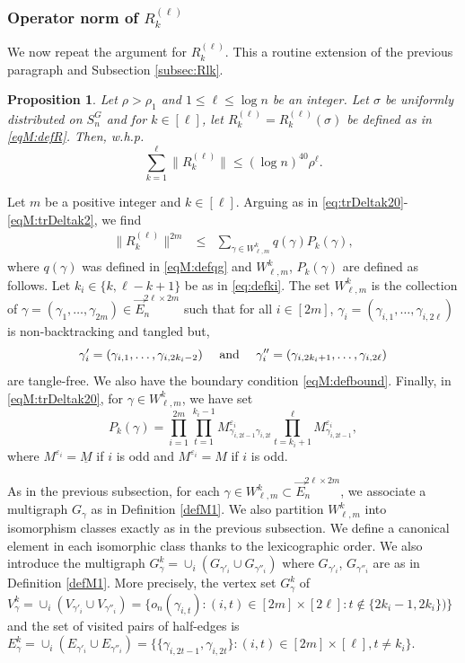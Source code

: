 \documentclass[11pt]{article}
\newtheorem{proposition}[lemma]{Proposition}
\newcommand{\cE}{E}
\newcommand{\1}{1\!\!{\sf I}}\newcommand{\IND}{\1}
\newcommand{\veps}{\varepsilon}
\newcommand{\whp}{{w.h.p.~}}
\begin{document}
\subsubsection{Operator norm of $R^{(\ell)}_{k}$}

We now repeat the argument for $R^{(\ell)}_{k}$. This a routine extension of the previous paragraph and Subsection \ref{subsec:Rlk}. 
\begin{proposition} \label{propM:normR}
Let  $\rho > \rho_1$ and $1 \leq \ell  \leq  \log n$ be an integer.  Let $\sigma$ be uniformly distributed on $S^G_n$ and  for $k \in [\ell]$, let $R_k^{(\ell)} = R_k^{(\ell)} (\sigma)$ be defined as in \eqref{eqM:defR}.  
Then, \whp  
$$ \sum_{k=1} ^\ell \| R_k^{(\ell)} \| \leq ( \log n) ^{40}   \rho ^{\ell}.$$
\end{proposition}
Let $m$ be a positive integer and $k \in [\ell]$. Arguing as in  \eqref{eq:trDeltak20}-\eqref{eqM:trDeltak2}, we find
\begin{eqnarray}
\| R^{(\ell)}_{k}  \| ^{2 m}  &\leq & \sum_{\gamma \in W^k_{\ell,m}} q (\gamma)  P_k (\gamma), \label{eqM:trDeltak20}
\end{eqnarray}
where $q(\gamma)$ was defined in \eqref{eqM:defqg} and $W^k_{\ell,m}$, $P_k(\gamma)$ are defined as follows. Let $k_i \in \{ k , \ell - k +1 \}$ be as in \eqref{eq:defki}. The set $W^k_{\ell,m}$ is the collection of  $\gamma = ( \gamma_1, \ldots, \gamma_{2m}) \in \vec E_n^{2\ell  \times 2m}$ such that for all $i \in [2m]$, $\gamma_i  = (\gamma_{i,1}, \ldots, \gamma_{i,2\ell})$ is non-backtracking and tangled but,  $$\gamma'_i = ( \gamma_{i,1}, \ldots , \gamma_{i,2k_i-2}) \quad  \hbox{ and } \quad \gamma''_i =  ( \gamma_{i,2k_i+1}, \ldots , \gamma_{i,2\ell})$$ are tangle-free.  We also have the boundary condition \eqref{eqM:defbound}. Finally, in \eqref{eqM:trDeltak20}, for $\gamma \in W^k_{\ell,m}$, we have set 
$$P_k (\gamma) =  \prod_{i=1}^{2m}  \prod_{t=1}^{k_i-1}  M^{\veps_i}_{\gamma_{i,2t-1}  \gamma_{i,2t}}   \prod_{t=k_i+1}^{\ell} M^{\veps_i}_{\gamma_{i,2t-1}}, $$
where $M^{\veps_i} = \underline M$ if $i$ is odd and $M^{\veps_i} = M$ if $i$ is odd.




As in the previous subsection, for each $\gamma \in W^k_{\ell,m} \subset \vec E_n^{2\ell \times 2m}$, we associate a multigraph $G_\gamma$ as in Definition \ref{defM1}.  We also partition  $W^k_{\ell,m}$ into isomorphism classes exactly as in the previous subsection. We define a canonical element in each isomorphic class thanks to the lexicographic order.  We also introduce the multigraph $G^k_\gamma = \cup_{i} (G_{\gamma'_i} \cup G_{\gamma''_i})$ where $G_{\gamma'_i}$, $G_{\gamma''_i}$ are as in Definition  \ref{defM1}. More precisely, the vertex set $G^k_\gamma$ of $V^k_\gamma = \cup_{i} (V_{\gamma'_i} \cup V_{\gamma''_i}) = \{ o_n(\gamma_{i,t}) : (i,t) \in [2m] \times [2\ell] : t  \notin \{2k_i-1,2k_i \}) \}$ and the set of visited pairs of half-edges is $\cE^k_\gamma = \cup_i (\cE_{\gamma'_i} \cup \cE_{\gamma''_i}) = \{ \{ \gamma_{i,2t-1}  , \gamma_{i,2t}  \} :   (i,t) \in [2m] \times [\ell], t \ne k_i \}$. 
\end{document}
